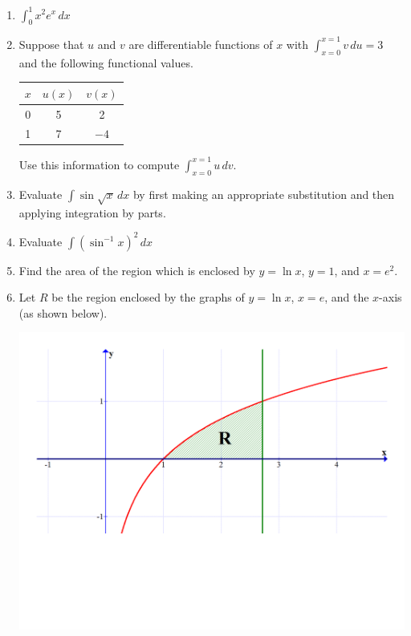 \documentclass[12pt]{article}
\newif\ifans
\begin{document}
\begin{enumerate}
\ifans{\fbox{$3\pi$; Detailed Solution: \textcolor{blue}{\href{http://www.math.drexel.edu/classes/Calculus/resources/Math122HW/Solutions/122_11_Parts_11.pdf}{Here}}}} \fi

\item $\int_{0}^{1}x^2e^{x}\,dx$ 

\ifans{\fbox{$e-2$}} \fi

\item Suppose that $u$ and $v$ are differentiable functions of $x$ with $\int_{x=0}^{x=1} v \,du = 3$ and the following functional values.\\
\begin{center}
\begin{tabular}{|c|c|c|}
\hline
$x$ & $u(x)$ & $v(x)$\\
\hline
0 & 5 & 2 \\
\hline
1 & 7 & $-4$\\
\hline
\end{tabular}
\end{center}
Use this information to compute $\int_{x=0}^{x=1} u \,dv$.

\ifans{\fbox{$-41$}} \fi

\item Evaluate $\int \sin{\sqrt{x}} \,dx$ by first making an appropriate substitution and then applying integration by parts.

\ifans{\fbox{$2\sin{(\sqrt{x})}-2\sqrt{x}\cos{(\sqrt{x})}+C$}} \fi

\item Evaluate $\int \left(\sin^{-1}x\right)^2 \,dx$

\ifans{\fbox{$x\left(\sin^{-1}x\right)^2-2x+2\sqrt{1-x^2}\left(\sin^{-1}x\right)+C$}} \fi

\item Find the area of the region which is enclosed by $y=\ln{x}$, $y=1$, and $x=e^2$.

\ifans{\fbox{$e$}} \fi

\item Let $R$ be the region enclosed by the graphs of $y=\ln{x}$, $x=e$, and the $x$-axis (as shown below).

\begin{center}
\includegraphics[scale=0.4]{volume2.pdf}
\end{center}


\end{enumerate}
\end{document}
